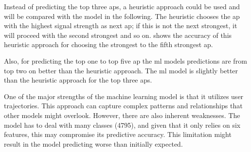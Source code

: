 Instead of predicting the top three \acp{ap}, a heuristic approach could be used and will be compared with the model in the following.
The heuristic chooses the \ac{ap} with the highest signal strength as next \ac{ap}; if this is not the next strongest, it will proceed with the second strongest and so on.
 shows the accuracy of this heuristic approach for choosing the strongest to the fifth strongest \ac{ap}.

Also, for predicting the top one to top five \ac{ap} the \ac{ml} models predictions are from top two on better than the heuristic approach.
The \ac{ml} model is slightly better than the heuristic approach for the top three \acp{ap}.


One of the major strengths of the machine learning model is that it utilizes user trajectories.
This approach can capture complex patterns and relationships that other models might overlook.
However, there are also inherent weaknesses.
The model has to deal with many classes (4795), and given that it only relies on six features, this may compromise its predictive accuracy.
This limitation might result in the model predicting worse than initially expected.